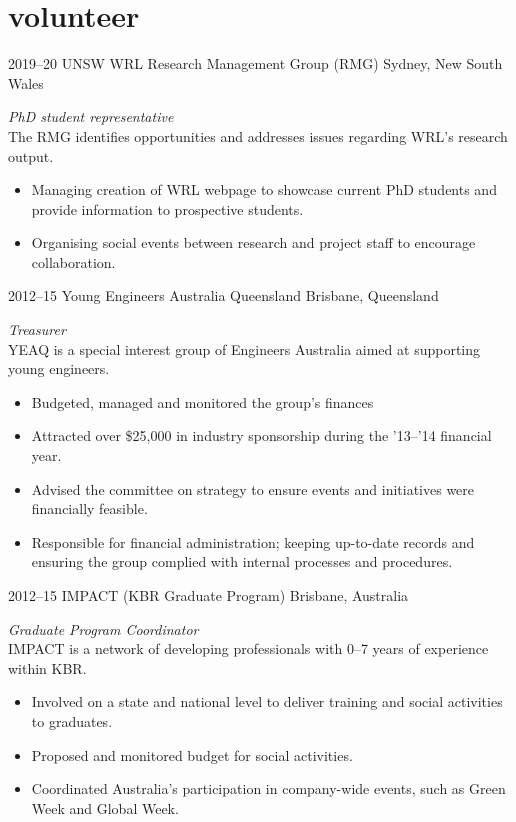 
\section{volunteer}


\begin{entrylist}
\entry%
{2019--20}
{UNSW WRL Research Management Group (RMG)}
{Sydney, New South Wales}
{\emph{PhD student representative} \\
The RMG identifies opportunities and addresses issues regarding WRL's research output.
\begin{itemize}
\item Managing creation of WRL webpage to showcase current PhD students and provide information to prospective students.
\item Organising social events between research and project staff to encourage collaboration.
\end{itemize}}
\end{entrylist}



\begin{entrylist}
\entry%
{2012--15}
{Young Engineers Australia Queensland}
{Brisbane, Queensland}
{\emph{Treasurer} \\
YEAQ is a special interest group of Engineers Australia aimed at supporting young engineers.
\begin{itemize}
\item Budgeted, managed and monitored the group's finances
\item Attracted over \$25,000 in industry sponsorship during the '13--'14 financial year.
\item Advised the committee on strategy to ensure events and initiatives were financially feasible.
\item Responsible for financial administration; keeping up-to-date records and ensuring the group complied with internal processes and procedures.
\end{itemize}}
\end{entrylist}

\begin{entrylist}
\entry%
{2012--15}
{IMPACT (KBR Graduate Program)}
{Brisbane, Australia}
{\emph{Graduate Program Coordinator} \\
IMPACT is a network of developing professionals with 0--7 years of experience within KBR.
\begin{itemize}
\item Involved on a state and national level to deliver training and social activities to graduates.
\item Proposed and monitored budget for social activities.
\item Coordinated Australia's participation in company-wide events, such as Green Week and Global Week.
\end{itemize}}
\end{entrylist}

